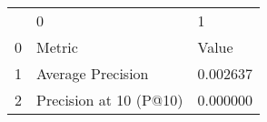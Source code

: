 \begin{tabular}{lll}
 & 0 & 1 \\
0 & Metric & Value \\
1 & Average Precision & 0.002637 \\
2 & Precision at 10 (P@10) & 0.000000 \\
\end{tabular}
